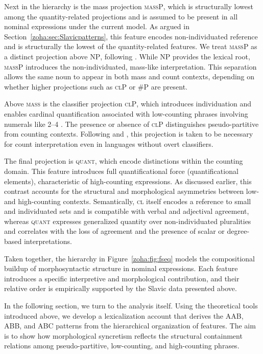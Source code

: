 \documentclass[output=paper,colorlinks,citecolor=brown
]{langscibook}
\begin{document}
Next in the hierarchy is the mass projection \textsc{massP}, which is structurally lowest among the quantity-related projections and is assumed to be present in all nominal expressions under the current model. As argued in Section~\ref{zoha:sec:Slavicpatterns}, this feature encodes non-individuated reference and is structurally the lowest of the quantity-related features. We treat \textsc{massP} as a distinct projection above \textsc{NP}, following \citet{chierchia1998,chierchia1998reference,Caha2022}. While \textsc{NP} provides the lexical root, \textsc{massP} introduces the non-individuated, mass-like interpretation. This separation allows the same noun to appear in both mass and count contexts, depending on whether higher projections such as \textsc{clP} or \textsc{\#P} are present.


Above \textsc{mass} is the classifier projection \textsc{clP}, which introduces individuation and enables cardinal quantification associated with low-counting phrases involving numerals like 2--4 \citep{Franks1995,Pesetsky2013}. The presence or absence of \textsc{clP} distinguishes pseudo-partitive from counting contexts. Following \citet{Borer2005} and \citet{Caha2022}, this projection is taken to be necessary for count interpretation even in languages without overt classifiers.

The final projection is \textsc{quant}, which encode distinctions within the counting domain. This feature introduces full quantificational force (quantificational elements), characteristic of high-counting expressions. As discussed earlier, this contrast accounts for the structural and morphological asymmetries between low- and high-counting contexts. Semantically, \textsc{cl} itself encodes a reference to small and individuated sets and is compatible with verbal and adjectival agreement, whereas \textsc{quant} expresses generalized quantity over non-individuated pluralities and correlates with the loss of agreement and the presence of scalar or degree-based interpretations. 

Taken together, the hierarchy in Figure~\ref{zoha:fig:fseq} models the compositional buildup of morphosyntactic structure in nominal expressions. Each feature introduces a specific interpretive and morphological contribution, and their relative order is empirically supported by the Slavic data presented above.

In the following section, we turn to the analysis itself. Using the theoretical tools introduced above, we develop a lexicalization account that derives the AAB, ABB, and ABC patterns from the hierarchical organization of features. The aim is to show how morphological syncretism reflects the structural containment relations among pseudo-partitive, low-counting, and high-counting phrases.
\end{document}
